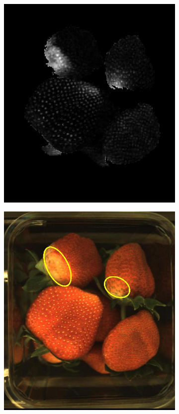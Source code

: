 \documentclass[fleqn,twoside]{article}
\begin{document}
\begin{figure}[ht]
\begin{subfigure}{.25\textwidth}
		\caption{}
		\label{fig:hsv}
	\end{subfigure}%
	\begin{subfigure}{.25\textwidth}
		\centering
		\includegraphics[width=.9\linewidth]{pow_image.jpg}
		\caption{}
		\label{fig:pow_image}
	\end{subfigure}%
	\begin{subfigure}{.25\textwidth}
		\centering
		\includegraphics[width=.9\linewidth]{result.jpg}
		\caption{}
		\label{fig:result}
	\end{subfigure}%
	

\end{figure}
\end{document}
